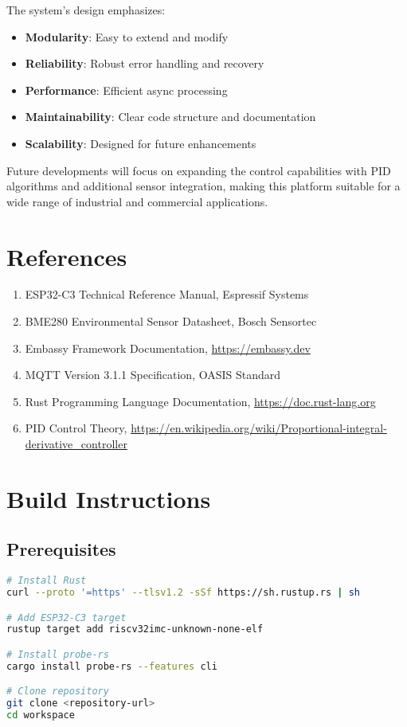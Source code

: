 \documentclass[12pt,a4paper]{article}
\begin{document}
The system's design emphasizes:
\begin{itemize}
    \item \textbf{Modularity}: Easy to extend and modify
    \item \textbf{Reliability}: Robust error handling and recovery
    \item \textbf{Performance}: Efficient async processing
    \item \textbf{Maintainability}: Clear code structure and documentation
    \item \textbf{Scalability}: Designed for future enhancements
\end{itemize}

Future developments will focus on expanding the control capabilities with PID algorithms and additional sensor integration, making this platform suitable for a wide range of industrial and commercial applications.

\section{References}

\begin{enumerate}
    \item ESP32-C3 Technical Reference Manual, Espressif Systems
    \item BME280 Environmental Sensor Datasheet, Bosch Sensortec
    \item Embassy Framework Documentation, \url{https://embassy.dev}
    \item MQTT Version 3.1.1 Specification, OASIS Standard
    \item Rust Programming Language Documentation, \url{https://doc.rust-lang.org}
    \item PID Control Theory, \url{https://en.wikipedia.org/wiki/Proportional-integral-derivative_controller}
\end{enumerate}

\appendix

\section{Build Instructions}

\subsection{Prerequisites}
\begin{lstlisting}[language=bash, caption={Development Environment Setup}]
# Install Rust
curl --proto '=https' --tlsv1.2 -sSf https://sh.rustup.rs | sh

# Add ESP32-C3 target
rustup target add riscv32imc-unknown-none-elf

# Install probe-rs
cargo install probe-rs --features cli

# Clone repository
git clone <repository-url>
cd workspace
\end{lstlisting}
\end{document}
